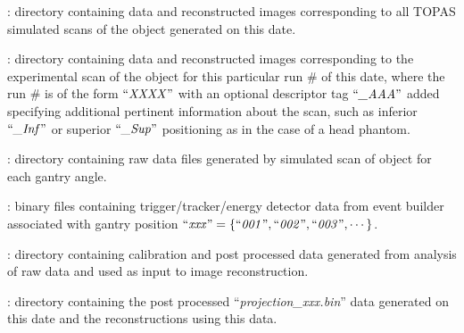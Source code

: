 \documentclass[landscape,12pt]{article}
\begin{document}
\begin{myEnumerate}[labelindent=1pt, leftmargin=*]
\begin{myEnumerate}[labelindent=1pt, leftmargin=*]
\begin{myEnumerate}[labelindent=1pt, leftmargin=*]
\begin{myEnumerate}[labelindent=1pt, leftmargin=*]
                \end{myEnumerate}
                \item {} \color{Black}: directory containing data and reconstructed images corresponding to all TOPAS simulated scans of the object generated on this date.
                \begin{myEnumerate}[labelindent=1pt, leftmargin=*]
                    \item {} \color{Black}: directory containing data and reconstructed images corresponding to the experimental scan of the object for this particular run \# of this date, where the run \# is of the form $\textrm{``\textit{XXXX}''}$ with an optional descriptor tag $\textrm{``\textit{\_AAA}''}$ added specifying additional pertinent information about the scan, such as inferior $\textrm{``\textit{\_Inf}''}$ or superior $\textrm{``\textit{\_Sup}''}$ positioning as in the case of a head phantom.
                    \begin{myEnumerate}[labelindent=1pt, leftmargin=*]
                        \item {} \color{Black}: directory containing raw data files generated by simulated scan of object for each gantry angle.
                        \begin{myEnumerate}[labelindent=1pt, leftmargin=*]
                            \item {} \color{Black}: binary files containing trigger/tracker/energy detector data from event builder associated with gantry position $\textrm{``\textit{xxx}''} =\{\textrm{``\textit{001}''}, \textrm{``\textit{002}''}, \textrm{``\textit{003}''}, \cdots\}$.
                        \end{myEnumerate}
                        \item {} \color{Black}: directory containing calibration and post processed data generated from analysis of raw data and used as input to image reconstruction.
                        \begin{myEnumerate}[labelindent=1pt, leftmargin=*]
                            \item {} \color{Black}: directory containing the post processed ``\textit{projection\_xxx.bin}'' data generated on this date and the reconstructions using this data.
                            \begin{myEnumerate}[labelindent=1pt, leftmargin=*]

\end{myEnumerate}
\end{myEnumerate}
\end{myEnumerate}
\end{myEnumerate}
\end{myEnumerate}
\end{myEnumerate}
\end{myEnumerate}
\end{document}
